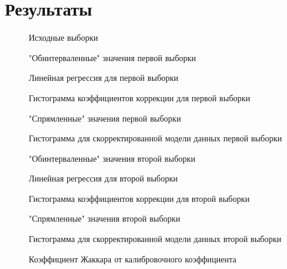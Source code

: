 \section{Результаты}
\begin{figure}[H]
	\caption{Исходные выборки}
	\label{fig:input_data}
\end{figure}
\begin{figure}[H]
	\caption{"Обинтерваленные"  значения первой выборки}
	\label{fig:data1_interval}
\end{figure}
\begin{figure}[H]
	\caption{Линейная регрессия для первой выборки}
	\label{fig:data1_fixed}
\end{figure}
\begin{figure}[H]
	\caption{Гистограмма коэффициентов коррекции для первой выборки}
	\label{fig:w1_hist}
\end{figure}
\begin{figure}[H]
	\caption{"Спрямленные"  значения первой выборки}
	\label{fig:data1_const}
\end{figure}
\begin{figure}[H]
	\caption{Гистограмма для скорректированной модели данных первой выборки}
	\label{fig:data1_hist_const}
\end{figure}
\begin{figure}[H]
	\caption{"Обинтерваленные"  значения второй выборки}
	\label{fig:data2_interval}
\end{figure}
\begin{figure}[H]
	\caption{Линейная регрессия для второй выборки}
	\label{fig:data2_fixed}
\end{figure}
\begin{figure}[H]
	\caption{Гистограмма коэффициентов коррекции для второй выборки}
	\label{fig:w2_hist}
\end{figure}
\begin{figure}[H]
	\caption{"Спрямленные"  значения второй выборки}
	\label{fig:data2_const}
\end{figure}
\begin{figure}[H]
	\caption{Гистограмма для скорректированной модели данных второй выборки}
	\label{fig:data2_hist_const}
\end{figure}
\begin{figure}[H]
	\caption{Коэффициент Жаккара от калибровочного коэффициента}
	\label{fig:jaccar}
\end{figure}